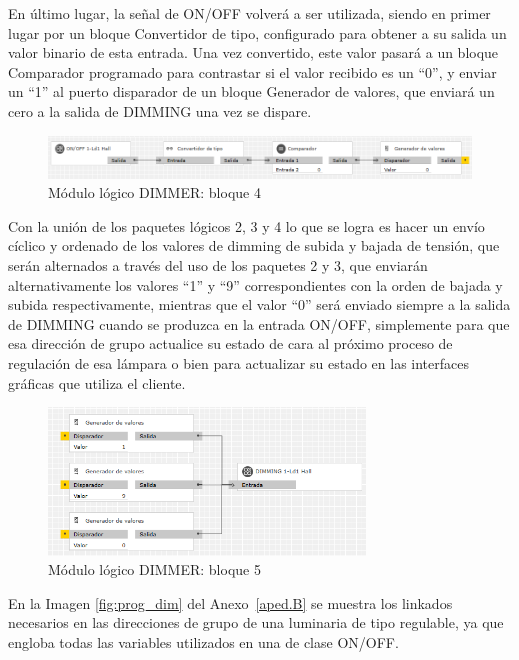 En último lugar, la señal de ON/OFF volverá a ser utilizada, siendo en primer lugar por un bloque Convertidor de tipo, configurado para obtener a su salida un valor binario de esta entrada. Una vez convertido, este valor pasará a un bloque Comparador programado para  contrastar si el valor recibido es un “0”, y enviar un “1” al puerto disparador de un bloque Generador de valores, que enviará un cero a la salida de DIMMING una vez se dispare. 
\begin{figure}[H]
\centering
\includegraphics[width=1\textwidth]{figures/log_dimm_b4.png}   
\caption{Módulo lógico DIMMER: bloque 4}
\label{fig:log_dimm_b4}
\end{figure}
Con la unión de los paquetes lógicos 2, 3 y 4 lo que se logra es hacer un envío cíclico y ordenado de los valores de dimming de subida y bajada de tensión, que serán alternados a través del uso de los paquetes 2 y 3, que enviarán alternativamente los valores “1” y “9” correspondientes con la orden de bajada y subida respectivamente, mientras que el valor “0” será enviado siempre a la salida de DIMMING cuando se produzca en la entrada ON/OFF, simplemente para que esa dirección de grupo actualice su estado de cara al próximo proceso de regulación de esa lámpara o bien para actualizar su estado en las interfaces gráficas que utiliza el cliente.
\begin{figure}[H]
\centering
\includegraphics[width=0.75\textwidth]{figures/log_dimm_b5.png}   
\caption{Módulo lógico DIMMER: bloque 5}
\label{fig:log_dimm_b5}
\end{figure}
En la Imagen \ref{fig:prog_dim} del Anexo~\ref{aped.B} se muestra los linkados necesarios en las direcciones de grupo de una luminaria de tipo regulable, ya que engloba todas las variables utilizados en una de clase ON/OFF.

